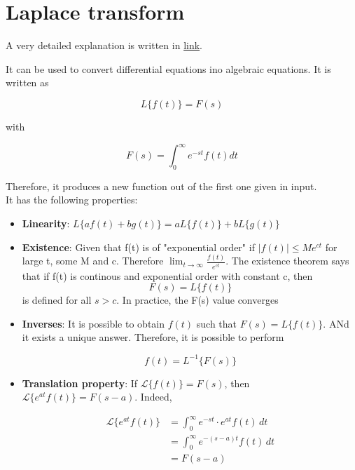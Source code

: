 \section{Laplace transform} \label{chap: laplace}

A very detailed explanation is written in \href{https://www.youtube.com/watch?v=n2y7n6jw5d0&pp=ygUcYnJpYWxsaWFudCBsYXBsYWNlIHRyYW5zZm9ybQ%3D%3D}{link}.

It can be used to convert differential equations ino algebraic equations. It is written as

\begin{equation}
    L\{f(t)\} = F(s)
\end{equation}

with

\begin{equation}
    F(s) = \int_0^\infty{e^{-st} f(t) dt}
\end{equation}

Therefore, it produces a new function out of the first one given in input.\\

It has the following properties:
\begin{itemize}

    \item \textbf{Linearity}: $L\{a f(t) + b g(t)\} = a L\{f(t)\} + b L\{g(t)\}$ 
    \item \textbf{Existence}: Given that f(t) is of "exponential order" if $|f(t)| \le M e^{ct}$ for large t, some M and c. Therefore $\lim_{t \rightarrow \infty}{\frac{f(t)}{e^{ct}}}$. The existence theorem says that if f(t) is continous and exponential order     with constant c, then
    $$
        F(s) = L\{f(t)\}
    $$
    is defined for all $s > c$. In practice, the F(s) value converges
    \item \textbf{Inverses}: It is possible to obtain $f(t)$ such that $F(s) = L\{f(t)\}$. ANd it exists a unique answer.
    Therefore, it is possible to perform

    \[
    f(t) = L^{-1}\{F(s)\}    
    \]

    \item \textbf{Translation property}: If \( \mathcal{L}\{f(t)\} = F(s) \), then \( \mathcal{L}\{e^{at} f(t)\} = F(s - a) \). Indeed,

    \begin{align*}
        \mathcal{L}\{e^{at} f(t)\} &= \int_0^\infty e^{-st} \cdot e^{at} f(t) \, dt \\
        &= \int_0^\infty e^{-(s - a)t} f(t) \, dt \\
        &= F(s - a)
    \end{align*}
\end{itemize}


